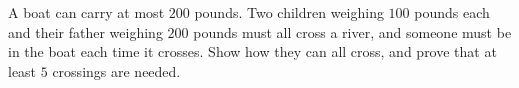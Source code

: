 A boat can carry at most $200$ pounds. Two children weighing $100$ pounds each and their father weighing $200$ pounds must all cross a river, and someone must be in the boat each time it crosses. Show how they can all cross, and prove that at least $5$ crossings are needed.
